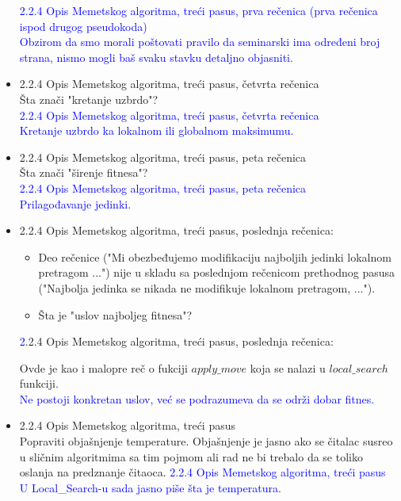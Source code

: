 \documentclass[a4paper]{report}
\newcommand{\odgovor}[1]{\textcolor{blue}{#1}}
\begin{document}
\begin{itemize}
   \odgovor{ 2.2.4 Opis Memetskog algoritma, treći pasus, prva rečenica (prva rečenica ispod drugog  pseudokoda) \\
   Obzirom da smo morali poštovati pravilo da seminarski ima određeni broj strana, nismo mogli baš svaku stavku detaljno objasniti.}
  
    \item 2.2.4 Opis Memetskog algoritma, treći pasus, četvrta rečenica \\
    Šta znači "kretanje uzbrdo"?\\
     \odgovor{ 2.2.4 Opis Memetskog algoritma, treći pasus, četvrta rečenica \\
     Kretanje uzbrdo ka lokalnom ili globalnom maksimumu.}
    
    \item 2.2.4 Opis Memetskog algoritma, treći pasus, peta rečenica \\
    Šta znači "širenje fitnesa"?\\
     \odgovor{ 2.2.4 Opis Memetskog algoritma, treći pasus, peta rečenica\\
    Prilagođavanje jedinki.\\}
    

    \item 2.2.4 Opis Memetskog algoritma, treći pasus, poslednja rečenica: 
        \begin{itemize}
            \item Deo rečenice ("Mi obezbeđujemo modifikaciju najboljih jedinki lokalnom pretragom ...") nije u skladu sa poslednjom rečenicom prethodnog pasusa ("Najbolja jedinka se nikada ne
            modifikuje lokalnom pretragom, ...").
            \item Šta je "uslov najboljeg fitnesa"?
        \end{itemize}
        
     \odgovor  2.2.4 Opis Memetskog algoritma, treći pasus, poslednja rečenica: 
     
     Ovde je kao i malopre reč o fukciji
     $apply\_move$ koja se nalazi u  $local\_search$ funkciji. \\
     \odgovor {Ne postoji konkretan uslov, već se podrazumeva da se održi dobar fitnes.}
     
     
     
     
    \item 2.2.4 Opis Memetskog algoritma, treći pasus \\
    Popraviti objašnjenje temperature. Objašnjenje je jasno ako se čitalac susreo u sličnim algoritmima sa tim pojmom ali rad ne bi trebalo da se toliko oslanja na predznanje čitaoca.
    \odgovor{2.2.4 Opis Memetskog algoritma, treći pasus \\ U Local\_Search-u sada jasno piše šta je temperatura.}
    

\end{itemize}
\end{document}
